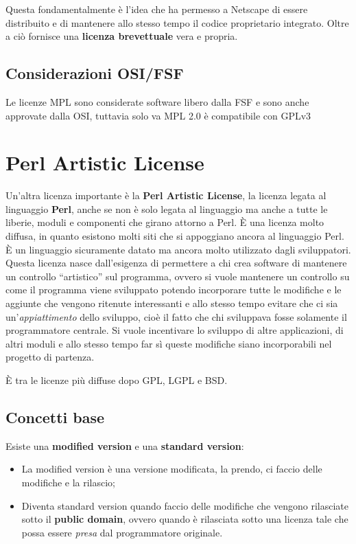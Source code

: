 Questa fondamentalmente è l'idea che ha permesso a Netscape di essere distribuito e di mantenere allo stesso tempo il codice proprietario integrato. Oltre a ciò fornisce una \textbf{licenza brevettuale} vera e propria.

\subsection{Considerazioni OSI/FSF}

Le licenze MPL sono considerate software libero dalla FSF e sono anche approvate dalla OSI, tuttavia solo va MPL 2.0 è compatibile con GPLv3

\section{Perl Artistic License}

Un'altra licenza importante è la \textbf{Perl Artistic License}, la licenza legata al linguaggio \textbf{Perl}, anche se non è solo legata al linguaggio ma anche a tutte le liberie, moduli e componenti che girano attorno a Perl. È una licenza molto diffusa, in quanto esistono molti siti che si appoggiano ancora al linguaggio Perl. È un linguaggio sicuramente datato ma ancora molto utilizzato dagli sviluppatori. Questa licenza nasce dall'esigenza di permettere a chi crea software di mantenere un controllo ``artistico'' sul programma, ovvero si vuole mantenere un controllo su come il programma viene sviluppato potendo incorporare tutte le modifiche e le aggiunte che vengono ritenute interessanti e allo stesso tempo evitare che ci sia un'\textit{appiattimento} dello sviluppo, cioè il fatto che chi sviluppava fosse solamente il programmatore centrale. Si vuole incentivare lo sviluppo di altre applicazioni, di altri moduli e allo stesso tempo far sì queste modifiche siano incorporabili nel progetto di partenza. 

È tra le licenze più diffuse dopo GPL, LGPL e BSD.

\subsection{Concetti base}

Esiste una \textbf{modified version} e una \textbf{standard version}:

\begin{itemize}

\item La modified version è una versione modificata, la prendo, ci faccio delle modifiche e la rilascio;
\item Diventa standard version quando faccio delle modifiche che vengono rilasciate sotto il \textbf{public domain}, ovvero quando è rilasciata sotto una licenza tale che possa essere \textit{presa} dal programmatore originale.

\end{itemize}

